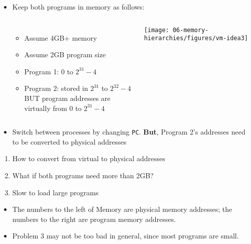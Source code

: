 \begin{frame}[fragile]
\begin{itemize}
\item Keep both programs in memory as follows:
\begin{columns}[c] %

\begin{itemize}
    \item Assume 4GB+ memory
    \item Assume 2GB program size
    \item Program 1: 0 to $2^{31}-4$
    \item Program 2: stored in $2^{31}$ to $2^{32}-4$ \\
	BUT program addresses are virtually from 0 to $2^{31}-4$
\end{itemize}


{\texttt{[image: 06-memory-hierarchies/figures/vm-idea3]}}

\end{columns}

    \item Switch between processes by changing \texttt{PC}. \textbf{But}, Program 2's addresses need to be converted to physical addresses 
\end{itemize}

    \begin{tcolorbox}[enhanced,attach boxed title to top center={yshift=-3mm,yshifttext=-1mm},
  colback=blue!5!white,colframe=blue!75!black,colbacktitle=blue!80!black,
  title=Think About It,fonttitle=\bfseries,
  boxed title style={size=small,colframe=red!50!black} ]
{\footnotesize
\begin{enumerate}
    \item How to convert from virtual to physical addresses
    \item What if both programs need more than 2GB?
    \item Slow to load large programs
\end{enumerate}
}
  \end{tcolorbox}


\BNotes\ifnum{}
\begin{itemize}
\item The numbers to the left of Memory are physical memory addresses;
	the numbers to the right are program memory addresses.
\item Problem 3 may not be too bad in general, since most programs
	are small.
\end{itemize}
\fi\ENotes
\end{frame}


